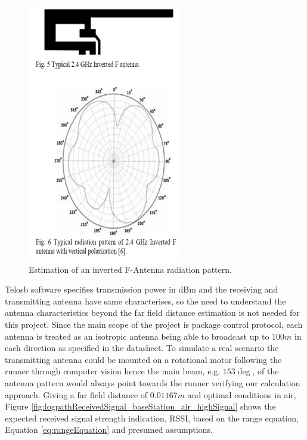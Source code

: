 \begin{figure}[H]
	\centering
	\includegraphics[width=0.8\linewidth]{theory/pathLoss/fig/invertedAntenna.png}
	\caption{Estimation of an inverted F-Antenna radiation pattern.}
	\label{fig:invertedAntenna}
\end{figure}

Telosb software specifies transmission power in dBm and the receiving and transmitting antenna have same characterises, so the need to understand the antenna characteristics beyond the far field distance estimation is not needed for this project. Since the main scope of the project is package control protocol, each antenna is treated as an isotropic antenna being able to broadcast up to $100m$ in each direction as specified in the datasheet. To simulate a real scenario the transmitting antenna could be mounted on a rotational motor following the runner through computer vision hence the main beam, e.g. $153\deg$, of the antenna pattern would always point towards the runner verifying our calculation approach. Giving a far field distance of $0.01167m$ and optimal conditions in air, Figure \ref{fig:logpathReceivedSignal_baseStation_air_highSignal} shows the expected received signal strength indication, RSSI, based on the range equation, Equation \ref{eq:rangeEquation} and presumed assumptions.



